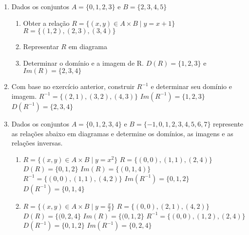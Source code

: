 \documentclass[a4paper, 12pt]{article}
\begin{document}
\begin{enumerate}
\item Dados os conjuntos $ A = \{0,1,2,3\} $ e $ B = \{2,3,4,5\} $
  \begin{enumerate}
  \item Obter a relação $ R = \{(x,y) \in A \times B \mid y = x + 1\} $ \newline
    $ R = \{(1,2),(2,3),(3,4)\} $
  \item Representar $R$ em diagrama
  \item Determinar o domínio e a imagem de R. \newline
    $ D(R) = \{1,2,3\} $ e $ Im(R) = \{2,3,4\} $
  \end{enumerate}
\item Com base no exercício anterior, construir $ R^{-1}$ e determinar seu domínio e imagem. \newline
  $ R^{-1} = \{(2,1),(3,2),(4,3)\} $ \newline
  $ Im(R^{-1}) = \{1,2,3\} $ \newline
  $ D(R^{-1}) = \{2,3,4\} $
\item Dados os conjuntos $ A = \{0,1,2,3,4\} $ e $ B = \{-1,0,1,2,3,4,5,6,7\} $ represente as relações abaixo em diagramas e determine os domínios, as imagens e as relações inversas.
  \begin{enumerate}
  \item $ R = \{(x,y) \in A \times B \mid y = x^2\} $ \newline
    $ R = \{(0,0),(1,1),(2,4)\} $ \newline
    $ D(R) = \{0, 1, 2\} $ \newline
    $ Im(R) = \{(0,1,4)\} $ \newline
    $ R^{-1} = \{(0,0),(1,1),(4,2)\} $ \newline
    $ Im(R^{-1}) = \{0,1,2\} $ \newline
    $ D(R^{-1}) = \{0,1,4\} $

  \item $ R = \{(x,y) \in A \times B \mid y = \frac{x}{2} \} $ \newline
    $ R = \{(0,0),(2,1),(4,2)\} $ \newline
    $ D(R) = \{(0,2,4\} $ \newline
    $ Im(R) = \{(0,1,2\} $ \newline
    $ R^{-1} = \{(0,0),(1,2),(2,4)\} $ \newline
    $ D(R^{-1}) = \{0,1,2\} $ \newline
    $ Im(R^{-1}) = \{0,2,4\} $ \newline


\end{enumerate}
\end{enumerate}
\end{document}
